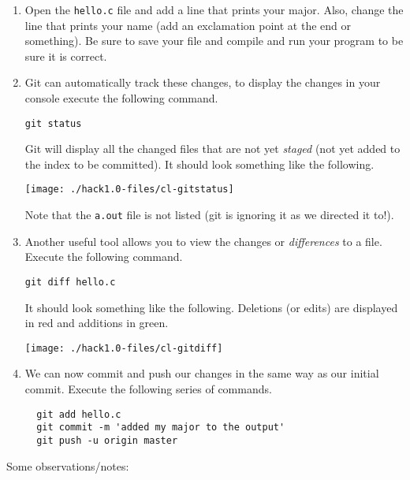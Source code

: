 \documentclass[12pt]{scrartcl}
\begin{document}
\begin{enumerate}
  \item Open the \texttt{hello.c} file and add a line that
  prints your major.  Also, change the line that prints your name
  (add an exclamation point at the end or something).  Be sure to
  save your file and compile and run your program to be sure it is 
  correct.

  \item Git can automatically track these changes, to display the
  changes in your console execute the following command.
  
  \texttt{git status}
  
  Git will display all the changed files that are not yet \emph{staged}
  (not yet added to the index to be committed).  It should look
  something like the following.
  
  \begin{center}
  \texttt{[image: ./hack1.0-files/cl-gitstatus]}
  \end{center}
  
  Note that the \texttt{a.out} file is not listed (git
  is ignoring it as we directed it to!).
  
  \item Another useful tool allows you to view the changes or
  \emph{differences} to a file.  Execute the following command.
  
  \texttt{git diff hello.c}

  It should look something like the following.  Deletions (or edits)
  are displayed in red and additions in green.

  \begin{center}
  \texttt{[image: ./hack1.0-files/cl-gitdiff]}
  \end{center}
  
  \item We can now commit and push our changes in the same way
  as our initial commit.  Execute the following series of commands.
  
  \begin{verbatim}
  git add hello.c
  git commit -m 'added my major to the output'
  git push -u origin master  
  \end{verbatim}

\end{enumerate}
  
Some observations/notes:
\end{document}
